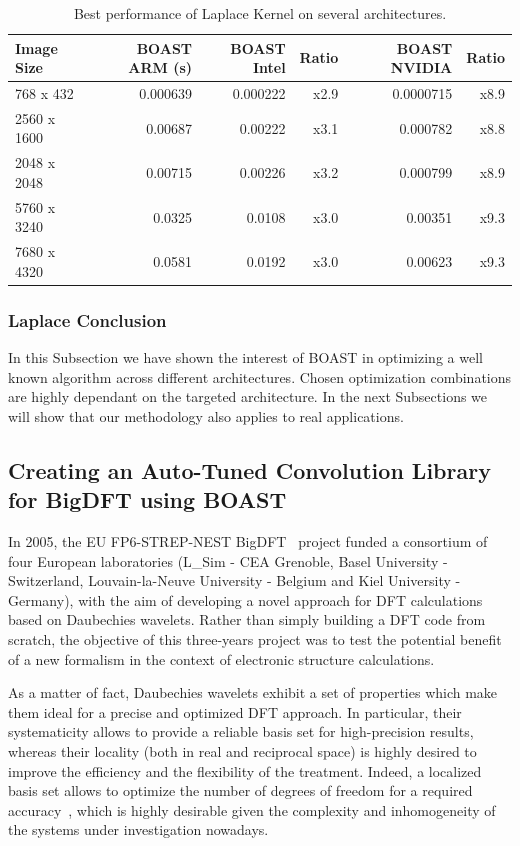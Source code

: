 \documentclass[11pt, a4paper, twoside]{montblanc}
\begin{document}
\begin{table}
\centering
\begin{tabular}{|l|r|r|r|r|r|}
\hline
Image Size & BOAST ARM (s) & BOAST Intel & Ratio & BOAST NVIDIA & Ratio \\
\hline
768 x 432   & 0.000639     & 0.000222    & x2.9  & 0.0000715    & x8.9  \\
\hline
2560 x 1600 & 0.00687      & 0.00222     & x3.1  & 0.000782     & x8.8  \\
\hline
2048 x 2048 & 0.00715      & 0.00226     & x3.2  & 0.000799     & x8.9  \\
\hline
5760 x 3240 & 0.0325       & 0.0108      & x3.0  & 0.00351      & x9.3  \\
\hline
7680 x 4320 & 0.0581       & 0.0192      & x3.0  & 0.00623      & x9.3  \\
\hline
\end{tabular}
\caption{Best performance of Laplace Kernel on several architectures.}
\label{tbl:other}
\end{table}

    \subsubsection{Laplace Conclusion}

In this Subsection we have shown the interest of BOAST in optimizing a well
known algorithm across different architectures. Chosen optimization combinations
are highly dependant on the targeted architecture. In the next Subsections we
will show that our methodology also applies to real applications.

  \subsection{Creating an Auto-Tuned Convolution Library for BigDFT using
BOAST}

In 2005, the EU FP6-STREP-NEST BigDFT~\cite{genovese2008daubechies} project
funded a consortium of four European laboratories (L\_Sim - CEA Grenoble, Basel
University - Switzerland, Louvain-la-Neuve University - Belgium and Kiel
University - Germany), with the aim of developing a novel approach for DFT
calculations based on Daubechies wavelets.  Rather than simply building a DFT
code from scratch, the objective of this three-years project was to test the
potential benefit of a new formalism in the context of electronic structure
calculations.

As a matter of fact, Daubechies wavelets exhibit a set of properties which make
them ideal for a precise and optimized DFT approach. In particular, their
systematicity allows to provide a reliable basis set for high-precision
results, whereas their locality (both in real and reciprocal space) is highly
desired to improve the efficiency and the flexibility of the treatment. Indeed,
a localized basis set allows to optimize the number of degrees of freedom for a
required accuracy~\cite{genovese2008daubechies}, which is highly desirable given
the complexity and inhomogeneity of the systems under investigation nowadays.
\end{document}
